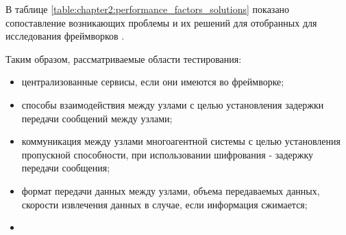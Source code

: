 В таблице \ref{table:chapter2:performance_factors_solutions} показано сопоставление возникающих проблемы и их решений для отобранных для исследования фреймворков \cite{blasco2012multiagent,bruyninckx2001orocos,einhorn2012mira,metta2006yarp,mohamed2008survey,elkady2012comprehensive}.



Таким образом, рассматриваемые области тестирования:
\begin{itemize}[noitemsep]
	\item централизованные сервисы, если они имеются во фреймворке;
	\item способы взаимодействия между узлами с целью установления задержки передачи сообщений между узлами;
	\item коммуникация между узлами многоагентной системы с целью установления пропускной способности, при использовании шифрования - задержку передачи сообщения;
	\item формат передачи данных между узлами, объема передаваемых данных, скорости извлечения данных в случае, если информация сжимается;
	\item {}
\end{itemize}
